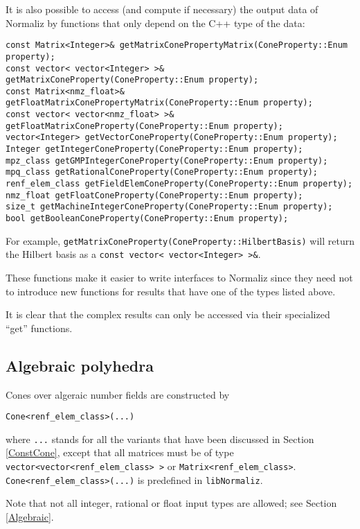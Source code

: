\documentclass[12pt,a4paper]{scrartcl}
\theoremstyle{definition}
\def\ttt{\texttt}
\begin{document}
\begin{small}
It is also possible to access (and compute if necessary) the output data of Normaliz by functions that only depend on the C++ type of the data:

\begin{Verbatim}
const Matrix<Integer>& getMatrixConePropertyMatrix(ConeProperty::Enum property);
const vector< vector<Integer> >& getMatrixConeProperty(ConeProperty::Enum property);    
const Matrix<nmz_float>& getFloatMatrixConePropertyMatrix(ConeProperty::Enum property);
const vector< vector<nmz_float> >& getFloatMatrixConeProperty(ConeProperty::Enum property);    
vector<Integer> getVectorConeProperty(ConeProperty::Enum property);    
Integer getIntegerConeProperty(ConeProperty::Enum property);    
mpz_class getGMPIntegerConeProperty(ConeProperty::Enum property);    
mpq_class getRationalConeProperty(ConeProperty::Enum property);
renf_elem_class getFieldElemConeProperty(ConeProperty::Enum property);   
nmz_float getFloatConeProperty(ConeProperty::Enum property);    
size_t getMachineIntegerConeProperty(ConeProperty::Enum property);    
bool getBooleanConeProperty(ConeProperty::Enum property);
\end{Verbatim}

For example, \verb|getMatrixConeProperty(ConeProperty::HilbertBasis)| will return the Hilbert basis as a \verb|const vector< vector<Integer> >&|. 

These functions make it easier to write interfaces to Normaliz since they need not to introduce new functions for results that have one of the types listed above.

It is clear that the complex results can only be accessed via their specialized ``get'' functions.

\subsection{Algebraic polyhedra}

Cones over algeraic number fields are constructed by
\begin{Verbatim}
Cone<renf_elem_class>(...)
\end{Verbatim}
where \ttt{...} stands for all the variants that have been discussed in Section \ref{ConstCone}, except that all matrices must be of type \verb+vector<vector<renf_elem_class> >+ or \verb+Matrix<renf_elem_class>+. \verb|Cone<renf_elem_class>(...)| is predefined in \ttt{libNormaliz}.

Note that not all integer, rational or float input types are allowed; see Section \ref{Algebraic}.


\end{small}
\end{document}

